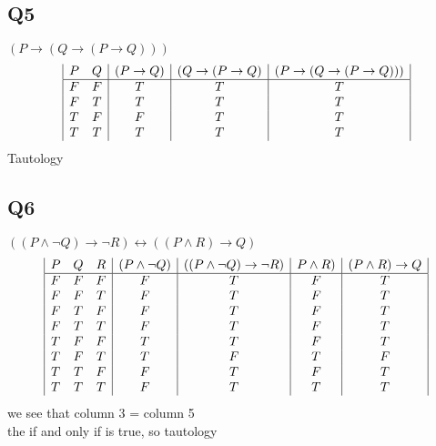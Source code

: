 \documentclass[a4paper,12pt]{article}
\begin{document}
\subsection{Q5}
$(P \rightarrow (Q \rightarrow (P \rightarrow Q)))$\\
\begin{displaymath}
\begin {array} {|c c |c|c|c|}
P & Q & (P \rightarrow Q) & (Q \rightarrow (P \rightarrow Q) 
&(P \rightarrow (Q \rightarrow (P \rightarrow Q)))\\
\hline
F & F & T & T & T \\
F & T & T & T & T \\
T & F & F & T & T \\
T & T & T & T & T \\

\end{array}
\end{displaymath}
Tautology\\

\subsection{Q6}
$((P \wedge \lnot Q) \rightarrow \lnot R) \leftrightarrow ((P \wedge R) \rightarrow Q)$\\
\begin{displaymath}
\begin {array} {|c c c|c|c|c|c|c|c|}
P & Q & R & (P \wedge \lnot Q) & 
((P \wedge \lnot Q) \rightarrow \lnot R)&
P \wedge R) &
(P \wedge R) \rightarrow Q\\
\hline
F & F & F & F & T & F & T\\
F & F & T & F & T & F & T\\
F & T & F & F & T & F & T\\
F & T & T & F & T & F & T\\
T & F & F & T & T & F & T\\
T & F & T & T & F & T & F\\
T & T & F & F & T & F & T\\
T & T & T & F & T & T & T\\
\end{array}
\end{displaymath}
we see that column 3 = column 5\\
the if and only if is true, so tautology\\
\pagebreak
\end{document}
